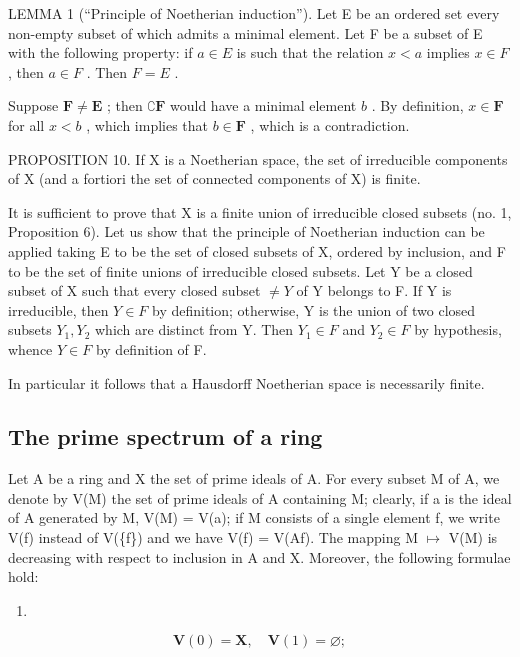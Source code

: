 LEMMA 1 (``Principle of Noetherian induction''). Let E be an ordered set every non-empty subset of which admits a minimal element. Let F be a subset of E with the following property: if \(a \in E\) is such that the relation \(x < a\) implies \(x \in F\) , then \(a \in F\) . Then \(F = E\) .

Suppose \(\mathbf{F} \neq \mathbf{E}\) ; then \(\complement\mathbf{F}\) would have a minimal element \(b\) . By definition, \(x \in \mathbf{F}\) for all \(x < b\) , which implies that \(b \in \mathbf{F}\) , which is a contradiction.

PROPOSITION 10. If X is a Noetherian space, the set of irreducible components of X (and a fortiori the set of connected components of X) is finite.

It is sufficient to prove that X is a finite union of irreducible closed subsets (no. 1, Proposition 6). Let us show that the principle of Noetherian induction can be applied taking E to be the set of closed subsets of X, ordered by inclusion, and F to be the set of finite unions of irreducible closed subsets. Let Y be a closed subset of X such that every closed subset \(\neq Y\) of Y belongs to F. If Y is irreducible, then \(Y \in F\) by definition; otherwise, Y is the union of two closed subsets \(Y_{1}, Y_{2}\) which are distinct from Y. Then \(Y_{1} \in F\) and \(Y_{2} \in F\) by hypothesis, whence \(Y \in F\) by definition of F.

In particular it follows that a Hausdorff Noetherian space is necessarily finite.

\subsection{The prime spectrum of a ring}

Let A be a ring and X the set of prime ideals of A. For every subset M of A, we denote by V(M) the set of prime ideals of A containing M; clearly, if a is the ideal of A generated by M, V(M) = V(a); if M consists of a single element f, we write V(f) instead of V(\{f\}) and we have V(f) = V(Af). The mapping M \(\mapsto\) V(M) is decreasing with respect to inclusion in A and X. Moreover, the following formulae hold:

\begin{enumerate}
\def\labelenumi{(\arabic{enumi})}
\tightlist
\item
\end{enumerate}

\[
\mathbf {V} (0) = \mathbf {X}, \quad \mathbf {V} (1) = \varnothing ;\tag{1}
\]

